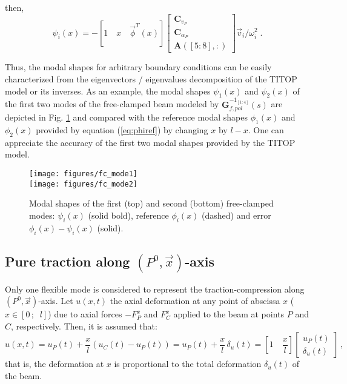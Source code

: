 then, 
\begin{equation}\label{eq:psi}
\psi_i(x)=-[1\quad x \quad \vec{\phi}^T(x)]\left[\begin{array}{c}\mathbf{C}_{v_P}\\ \mathbf{C}_{\alpha_P} \\\mathbf{A}([5:8],:)\end{array}\right]\vec{v}_i/\omega_i^2\;.
\end{equation}

Thus, the modal shapes for arbitrary boundary conditions can be easily characterized from the eigenvectors / eigenvalues decomposition of the TITOP model or its inverses. As an example, the modal shapes $\psi_1(x)$ and $\psi_2(x)$ of the first two modes of the free-clamped beam modeled by $\mathbf{G}_{f,pol}^{-1_{[1:4]}}(s)$ are depicted in Fig. \ref{fig:fc1_2} and compared with the reference modal shapes $\phi_1(x)$ and $\phi_2(x)$ provided by equation (\ref{eq:phiref}) by changing $x$ by $l-x$. One can appreciate the accuracy of the first two modal shapes provided by the TITOP model.
\begin{figure}[htbp!]
  \texttt{[image: figures/fc\_mode1]}\\
  \texttt{[image: figures/fc\_mode2]}
\caption{Modal shapes of the first (top) and second (bottom) free-clamped modes: $\psi_i(x)$ (solid bold), reference $\phi_i(x)$ (dashed) and error $\phi_i(x)-\psi_i(x)$ (solid).}
\label{fig:fc1_2} 
\end{figure}

\subsection{Pure traction along $(P^0,\vec{x})$-axis}
Only one flexible mode is considered to represent the traction-compression along  $(P^0,\vec{x})$-axis. Let $u(x,t)$ the axial deformation at any point of abscissa  $x$ ($x\in [0\,;\;\; l]$) due to axial forces $-F^x_P$ and $F^x_C$ applied to the beam at points $P$ and $C$, respectively. Then, it is assumed that:
\[
u(x,t)= u_P(t)+\frac{x}{l}(u_C(t)-u_P(t))=u_P(t)+\frac{x}{l}\,\delta_u(t)=\left[1\quad \frac{x}{l}\right]\left[\begin{array}{c} u_P(t)\\ \delta_u(t)\end{array}\right]\,,
\]
that is, the deformation at $x$ is proportional to the total deformation $\delta_u(t)$ of the beam.

